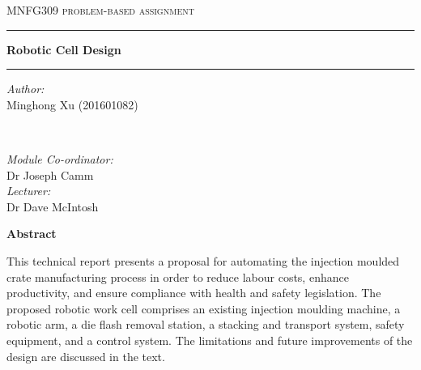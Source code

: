\begin{titlepage}
\center %



\vspace{6mm}

\textsc{\Large MNFG309 problem-based assignment}

\vspace{6mm}

\rule[6mm]{\linewidth}{0.75mm}
{\LARGE\bfseries Robotic Cell Design}
\rule[-3mm]{\linewidth}{0.75mm}

\vspace{5mm}

\begin{minipage}{0.4\textwidth}
   \begin{flushleft}
      \emph{Author:} \\
      Minghong Xu (201601082)
   \end{flushleft}
\end{minipage}
~
\begin{minipage}{0.4\textwidth}
   \begin{flushright}
      \emph{Module Co-ordinator:} \\
      Dr Joseph Camm
      \\[1.2em]
      \emph{Lecturer:} \\
      Dr Dave McIntosh
   \end{flushright}
\end{minipage}

\vspace{5mm}

\textbf{Abstract}
\begin{spacing}{1.0}
\parbox{0.85\textwidth}{
   This technical report presents a proposal for automating the injection moulded crate manufacturing process in order to reduce labour costs, enhance productivity, and ensure compliance with health and safety legislation. The proposed robotic work cell comprises an existing injection moulding machine, a robotic arm, a die flash removal station, a stacking and transport system, safety equipment, and a control system. The limitations and future improvements of the design are discussed in the text.
}
\end{spacing}

\vfill


\end{titlepage}
